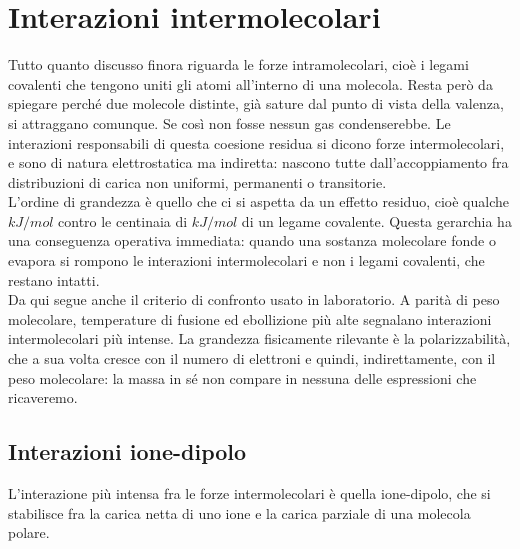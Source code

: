\chapter{Interazioni intermolecolari}

Tutto quanto discusso finora riguarda le forze intramolecolari, cioè i legami covalenti che tengono uniti gli atomi all'interno di una molecola.
Resta però da spiegare perché due molecole distinte, già sature dal punto di vista della valenza, si attraggano comunque.
Se così non fosse nessun gas condenserebbe. Le interazioni responsabili di questa coesione residua si dicono forze intermolecolari, e sono di natura elettrostatica ma indiretta: nascono tutte dall'accoppiamento fra distribuzioni di carica non uniformi, permanenti o transitorie.\\

L'ordine di grandezza è quello che ci si aspetta da un effetto residuo, cioè qualche $kJ/mol$ contro le centinaia di $kJ/mol$ di un legame covalente.
Questa gerarchia ha una conseguenza operativa immediata: quando una sostanza molecolare fonde o evapora si rompono le interazioni intermolecolari e non i legami covalenti, che restano intatti.\\

Da qui segue anche il criterio di confronto usato in laboratorio.
A parità di peso molecolare, temperature di fusione ed ebollizione più alte segnalano interazioni intermolecolari più intense.
La grandezza fisicamente rilevante è la polarizzabilità, che a sua volta cresce con il numero di elettroni e quindi, indirettamente, con il peso molecolare: la massa in sé non compare in nessuna delle espressioni che ricaveremo.

\section{Interazioni ione-dipolo}

L'interazione più intensa fra le forze intermolecolari è quella ione-dipolo, che si stabilisce fra la carica netta di uno ione e la carica parziale di una molecola polare.

